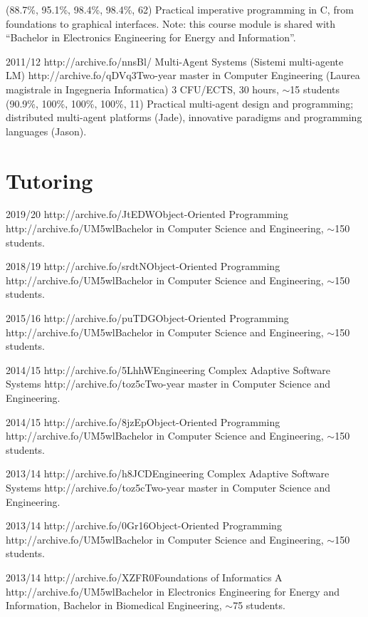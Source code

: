 \begin{outerlist}
        {(88.7\%, 95.1\%, 98.4\%, 98.4\%, 62)}
        {
            Practical imperative programming in C, from foundations to graphical interfaces.
            Note: this course module is shared with ``Bachelor in Electronics Engineering for Energy and Information''.
        }
    \item[2011/12]
        \unibocourse
        {http://archive.fo/nnsBl/}
        {Multi-Agent Systems (Sistemi multi-agente LM)}
        {http://archive.fo/qDVq3}{Two-year master in Computer Engineering (Laurea magistrale in Ingegneria Informatica)}
        {3 CFU/ECTS, 30 hours, $\sim$15 students}
        {(90.9\%, 100\%, 100\%, 100\%, 11)}
        {Practical multi-agent design and programming; distributed multi-agent platforms (Jade), innovative paradigms and programming languages (Jason).}
\end{outerlist}

\section{Tutoring}
\vspace{-1.9em}
\begin{outerlist}
    \item[2019/20]
        \shortunibocourse
        {http://archive.fo/JtEDW}{Object-Oriented Programming}
        {http://archive.fo/UM5wl}{Bachelor in Computer Science and Engineering}, $\sim$150 students.
    \item[2018/19]
        \shortunibocourse
        {http://archive.fo/srdtN}{Object-Oriented Programming}
        {http://archive.fo/UM5wl}{Bachelor in Computer Science and Engineering}, $\sim$150 students.
    \item[2015/16]
        \shortunibocourse
        {http://archive.fo/puTDG}{Object-Oriented Programming}
        {http://archive.fo/UM5wl}{Bachelor in Computer Science and Engineering}, $\sim$150 students.
    \item[2014/15]
        \shortunibocourse
        {http://archive.fo/5LhhW}{Engineering Complex Adaptive Software Systems}
        {http://archive.fo/toz5c}{Two-year master in Computer Science and Engineering}.
    \item[2014/15]
        \shortunibocourse
        {http://archive.fo/8jzEp}{Object-Oriented Programming}
        {http://archive.fo/UM5wl}{Bachelor in Computer Science and Engineering}, $\sim$150 students.
    \item[2013/14]
        \shortunibocourse
        {http://archive.fo/h8JCD}{Engineering Complex Adaptive Software Systems}
        {http://archive.fo/toz5c}{Two-year master in Computer Science and Engineering}.
    \item[2013/14]
        \shortunibocourse
        {http://archive.fo/0Gr16}{Object-Oriented Programming}
        {http://archive.fo/UM5wl}{Bachelor in Computer Science and Engineering}, $\sim$150 students.
    \item[2013/14]
        \shortunibocourse
        {http://archive.fo/XZFR0}{Foundations of Informatics A}
        {http://archive.fo/UM5wl}{Bachelor in Electronics Engineering for Energy and Information, Bachelor in Biomedical Engineering}, $\sim$75 students.
\end{outerlist}

